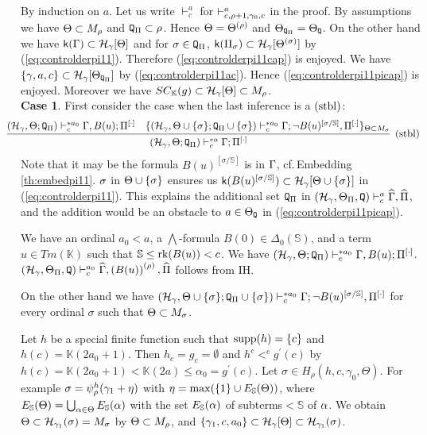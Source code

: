 \documentclass{article}
\newcommand{\mS}{\mathbb{S}}
\newcommand{\mK}{\mathbb{K}}
\begin{document}
\elem
\bprf
By induction on $a$. 
Let us 
write $\vdash^{a}_{c}$ for $\vdash^{a}_{c,\rho+1,\gamma_{0},c}$ in the proof.
By assumptions we have
$\Theta \subset M_{\rho}$ and ${\tt Q}_{\Pi}\subset\rho$.
Hence $\Theta=\Theta^{(\rho)}$ and $\Theta_{{\tt Q}_{\Pi}}=\Theta_{{\tt Q}}$.
On the other hand we have
${\sf k}(\Gamma)\subset{\cal H}_{\gamma}[\Theta]$ and for $\sigma\in{\tt Q}_{\Pi}$,
${\sf k}(\Pi_{\sigma})\subset{\cal H}_{\gamma}[\Theta^{(\sigma)}]$ by (\ref{eq:controlderpi11}).
Therefore (\ref{eq:controlderpi11cap}) is enjoyed.
We have $\{\gamma,a,c\}\subset{\cal H}_{\gamma}[\Theta_{{\tt Q}_{\Pi}}]$ 
by
(\ref{eq:controlderpi11ac}).
Hence (\ref{eq:controlderpi11picap}) is enjoyed.
Moreover we have 
$SC_{\mK}(g)\subset \calh_{\gam}[\Tht]\subset M_{\rho}$.
\\
\textbf{Case 1}. 
First consider the case when the last inference is a $({\rm stbl})$: 
{\small
\[
\hspace{-5mm}
\infer[({\rm stbl})]{(\mathcal{H}_{\gamma},\Theta;{\tt Q}_{\Pi}
)
\vdash^{* a}_{c}
\Gamma;\Pi^{[\cdot]}}
{
(\mathcal{H}_{\gamma},\Theta;{\tt Q}_{\Pi}
)\vdash^{* a_{0}}_{c}
\Gamma, B(u);\Pi^{[\cdot]}
&
\{
(\mathcal{H}_{\gamma},\Theta\cup\{\sig\};{\tt Q}_{\Pi}\cup\{\sig\}
)
\vdash^{* a_{0}}_{c}
\Gamma; \lnot B(u)^{[\sigma/\mathbb{S}]},\Pi^{[\cdot]}
\}_{\Tht\subset M_{\sigma}}
}
\]
}
Note that it may be  the formula $B(u)^{[\sigma/\mathbb{S}]}$ is in $\Gamma$, 
cf.\,Embedding \ref{th:embedpi11}.
$\sigma$ in $\Theta\cup\{\sigma\}$ ensures us 
${\sf k}(B(u)^{[\sigma/\mathbb{S}]})\subset{\cal H}_{\gamma}[\Theta\cup\{\sigma\}]$ in (\ref{eq:controlderpi11}).
This explains the additional set ${\tt Q}_{\Pi}$ in 
$
(\mathcal{H}_{\gamma},\Theta_{\Pi},{\tt Q}
)\vdash^{a}_{c}
\widehat{\Gamma},\widehat{\Pi}
$, and the addition would be an obstacle to $a\in\Theta_{{\tt Q}}$ in (\ref{eq:controlderpi11picap}).


We have 
an ordinal $a_{0}<a$, 
a $\bigwedge$-formula
$B(0)\in\Delta_{0}(\mathbb{S})$, and
a term $u\in Tm(\mathbb{K})$
such that $\mS\leq{\rm rk}(B(u))<c$.
We have
$
(\mathcal{H}_{\gamma},\Theta;{\tt Q}_{\Pi}
)\vdash^{* a_{0}}_{c}
\Gamma, B(u);\Pi^{[\cdot]}
$.
$
(\mathcal{H}_{\gamma},\Theta_{\Pi},{\tt Q}
)\vdash^{a_{0}}_{c}
\widehat{\Gamma},\left(B(u)\right)^{(\rho)},\widehat{\Pi}
$ follows from IH.

On the other hand we have
$
(\mathcal{H}_{\gamma},\Theta\cup\{\sigma\};{\tt Q}_{\Pi}\cup\{\sigma\}
)\vdash^{* a_{0}}_{c}
\Gamma; \lnot B(u)^{[\sigma/\mathbb{S}]},\Pi^{[\cdot]}
$
for every ordinal $\sigma$ such that
$\Theta\subset M_{\sigma}$.


Let $h$ be a special finite function such that ${\rm supp}(h)=\{c\}$ and
$h(c)=\mathbb{K}(2a_{0}+1)$.
Then $h_{c}=g_{c}=\emptyset$ and $h^{c}<^{c}g^{\prime}(c)$
by $h(c)=\mathbb{K}(2a_{0}+1)<\mathbb{K}(2a)\leq\alpha_{0}=g^{\prime}(c)$.
Let $\sigma\in H_{\rho}(h,c,\gamma_{0},\Theta)$.
For example $\sigma=\psi_{\rho}^{h}(\gamma_{1}+\eta)$ with $\eta=\max(\{1\}\cup E_{\mS}(\Tht))$, where
$E_{\mS}(\Tht)=\bigcup_{\alp\in\Tht}E_{\mS}(\alp)$ with the set
$E_{\mS}(\alp)$ of subterms$<\mS$ of $\alpha$.
We obtain $\Theta\subset {\cal H}_{\gamma_{1}}(\sigma)=M_{\sigma}$ by $\Theta\subset M_{\rho}$, and
$\{\gamma_{1},c,a_{0}\}\subset\mathcal{H}_{\gamma}[\Theta]\subset
{\cal H}_{\gamma_{1}}(\sigma)$.
\end{document}
